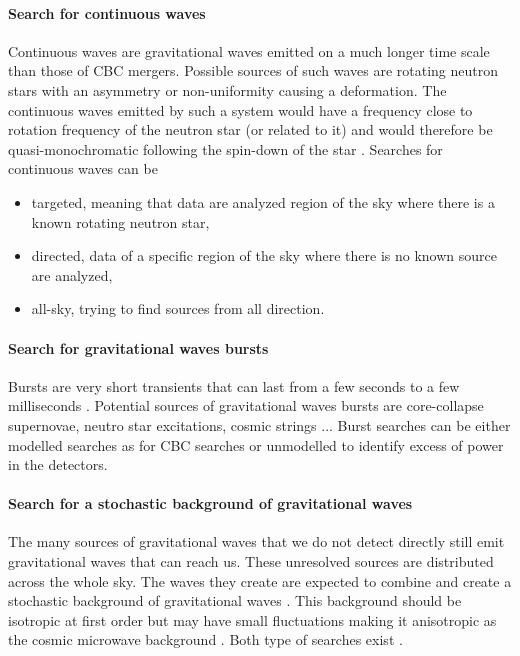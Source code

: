 \paragraph*{Search for continuous waves}
Continuous waves are gravitational waves emitted on a much longer time scale than those of CBC mergers.
Possible sources of such waves are rotating neutron stars with an asymmetry or non-uniformity causing a deformation.
The continuous waves emitted by such a system would have a frequency close to rotation frequency of the neutron star (or related to it) and would therefore be quasi-monochromatic following the spin-down of the star \cite{LVK_cw}.
Searches for continuous waves can be
\begin{itemize}
\item targeted, meaning that data are analyzed region of the sky where there is a known rotating neutron star,
\item directed, data of a specific region of the sky where there is no known source are analyzed,
\item all-sky, trying to find sources from all direction.
\end{itemize}

\paragraph*{Search for gravitational waves bursts}
Bursts are very short transients that can last from a few seconds to a few milliseconds .
Potential sources of gravitational waves bursts are core-collapse supernovae, neutro star excitations, cosmic strings \cite{LVK_burst}...
Burst searches can be either modelled searches as for CBC searches or unmodelled to identify excess of power in the detectors.

\paragraph*{Search for a stochastic background of gravitational waves}
The many sources of gravitational waves that we do not detect directly still emit gravitational waves that can reach us.
These unresolved sources are distributed across the whole sky.
The waves they create are expected to combine and create a stochastic background of gravitational waves \cite{stochastic}.
This background should be isotropic at first order but may have small fluctuations making it anisotropic as the cosmic microwave background \cite{cmb}.
Both type of searches exist \cite{LVK_stochastic_aniso,LVK_stochastic_iso}.

